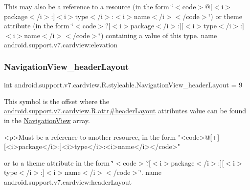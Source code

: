 This may also be a reference to a resource (in the form \char`\"{}$<$code$>$@\mbox{[}$<$i$>$package$<$/i$>$\+:\mbox{]}$<$i$>$type$<$/i$>$\+:$<$i$>$name$<$/i$>$$<$/code$>$\char`\"{}) or theme attribute (in the form \char`\"{}$<$code$>$?\mbox{[}$<$i$>$package$<$/i$>$\+:\mbox{]}\mbox{[}$<$i$>$type$<$/i$>$\+:\mbox{]}$<$i$>$name$<$/i$>$$<$/code$>$\char`\"{}) containing a value of this type.  name android.\+support.\+v7.\+cardview\+:elevation \mbox{\label{classandroid_1_1support_1_1v7_1_1cardview_1_1R_1_1styleable_a295bd44f7203a8812e422aecbcc036d4}} 
\subsubsection{\texorpdfstring{Navigation\+View\+\_\+header\+Layout}{NavigationView\_headerLayout}}
{\footnotesize\ttfamily int android.\+support.\+v7.\+cardview.\+R.\+styleable.\+Navigation\+View\+\_\+header\+Layout = 9\hspace{0.3cm}{\ttfamily [static]}}

This symbol is the offset where the \hyperlink{classandroid_1_1support_1_1v7_1_1cardview_1_1R_1_1attr_a16409e04c171c12c016138a8e5b33b47}{android.\+support.\+v7.\+cardview.\+R.\+attr\#header\+Layout} attribute\textquotesingle{}s value can be found in the \hyperlink{classandroid_1_1support_1_1v7_1_1cardview_1_1R_1_1styleable_aab4216e563b2e19093e1d57494734202}{Navigation\+View} array.

\begin{DoxyVerb}      <p>Must be a reference to another resource, in the form "<code>@[+][<i>package</i>:]<i>type</i>:<i>name</i></code>"
\end{DoxyVerb}
 or to a theme attribute in the form \char`\"{}$<$code$>$?\mbox{[}$<$i$>$package$<$/i$>$\+:\mbox{]}\mbox{[}$<$i$>$type$<$/i$>$\+:\mbox{]}$<$i$>$name$<$/i$>$$<$/code$>$\char`\"{}.  name android.\+support.\+v7.\+cardview\+:header\+Layout \mbox{\label{classandroid_1_1support_1_1v7_1_1cardview_1_1R_1_1styleable_a1a21d53170287aa58f15ebb0407ff257}} 
